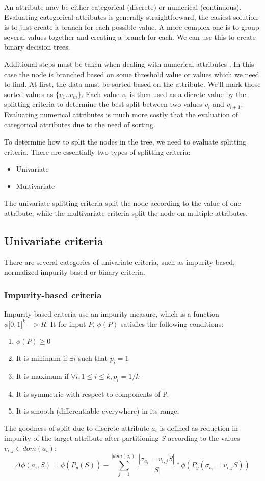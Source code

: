 \documentclass[thesis=B,english]{FITthesis}[2012/10/20]
\begin{document}
			An attribute may be either categorical (discrete) or numerical (continuous). Evaluating categorical attributes is generally straightforward, the easiest solution is to just create a branch for each possible value. A more complex one is to group several values together and creating a branch for each. We can use this to create binary decision trees.

			Additional steps must be taken when dealing with numerical attributes \cite{C45-NUMERICAL}.	 In this case the node is branched based on some threshold value or values which we need to find. At first, the data must be sorted based on the attribute. We'll mark those sorted values as \(\{v_1..v_m\}\). Each value \(v_i\) is then used as a dicrete value by the splitting criteria to determine the best split between two values \(v_i\) and \(v_{i+1}\). Evaluating numerical attributes is much more costly that the evaluation of categorical attributes due to the need of sorting.

			To determine how to split the nodes in the tree, we need to evaluate splitting criteria. There are essentially two types of splitting criteria:
			\begin{itemize}
			\item Univariate
			\item Multivariate
			\end{itemize}
			The univariate splitting criteria split the node according to the value of one attribute, while the multivariate criteria split the node on multiple attributes.

			\subsection{Univariate criteria}
				There are several categories of univariate criteria, such as impurity-based, normalized impurity-based or binary criteria. \cite{DMWithDecisionTrees}
				\subsubsection{Impurity-based criteria}
				Impurity-based criteria use an impurity measure, which is a function \(\phi\lbrack0,1\rbrack^k->R\). It for input \(P\), \(\phi(P)\) satisfies the following conditions:
				\begin{enumerate}
				\item \(\phi(P) \geq 0\)
				\item It is minimum if \(\exists i\) such that \(p_i = 1\)
				\item It is maximum if \(\forall i, 1 \leq i \leq k, p_i = 1/k\)
				\item It is symmetric with respect to components of P.
				\item It is smooth (differentiable everywhere) in its range.	
				\end{enumerate}
				The goodness-of-split due to discrete attribute \(a_i\) is defined as reduction in impurity of the target attribute after partitioning \(S\) according to the values \(v_{i,j} \in \textit{dom}(a_i)\):
				\[
					\Delta\phi(a_i,S)=\phi(P_y(S))-\sum\limits_{j=1}^{|\textit{dom}(a_i)|}{\frac{|\sigma_{a_i}=v_{i,j}S|}{|S|}*\phi\left(P_y\left(\sigma_{a_i}=v_{i,j}S\right)\right)}
				\]
\end{document}
